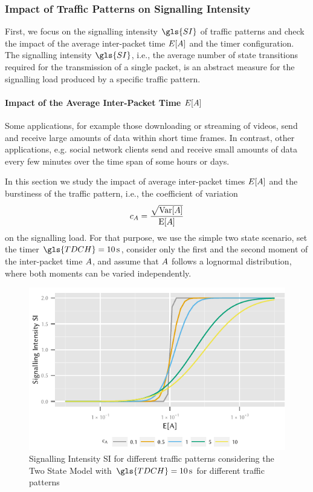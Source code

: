 \subsubsection*{Impact of Traffic Patterns on Signalling Intensity}\label{sec:network:performance_model:signalling_intensity}
First, we focus on the signalling intensity \(\gls{SI}\) of traffic patterns and check the impact of the average inter-packet time \(E[A]\) and the timer configuration. The signalling intensity \(\gls{SI}\), i.e., the average number of state transitions required for the transmission of a single packet, is an abstract measure for the signalling load produced by a specific traffic pattern.

\paragraph*{Impact of the Average Inter-Packet Time \(E[A]\)}\label{sec:network:performance_model:signalling_intensity:ea}
Some applications, for example those downloading or streaming of videos, send and receive large amounts of data within short time frames.
In contrast, other applications, e.g. social network clients send and receive small amounts of data every few minutes over the time span of some hours or days.

In this section we study the impact of average inter-packet times \(E[A]\) and the burstiness of the traffic pattern, i.e., the coefficient of variation 
\[c_{A} = \frac{\sqrt{\mathrm{Var}[A]}}{\mathrm{E}[A]}\]
 on the signalling load.
For that purpose, we use the simple two state scenario, set the timer \(\gls{TDCH}=\SI{10}{\second}\), consider only the first and the second moment of the inter-packet time \(A\), and assume that \(A\) follows a lognormal distribution, where both moments can be varied independently.

\begin{figure}
	\centering
	\includegraphics{network/performance_model/numerical_examples/figures/2state_ea_si}
	\caption{Signalling Intensity \gls{SI} for different traffic patterns considering the Two State Model with \(\gls{TDCH}=\SI{10}{\second}\) for different traffic patterns}
	\label{fig:network:performance_model:numerical_examples:validations:analytic_vs_simulation:2state_ea_si}
\end{figure}

